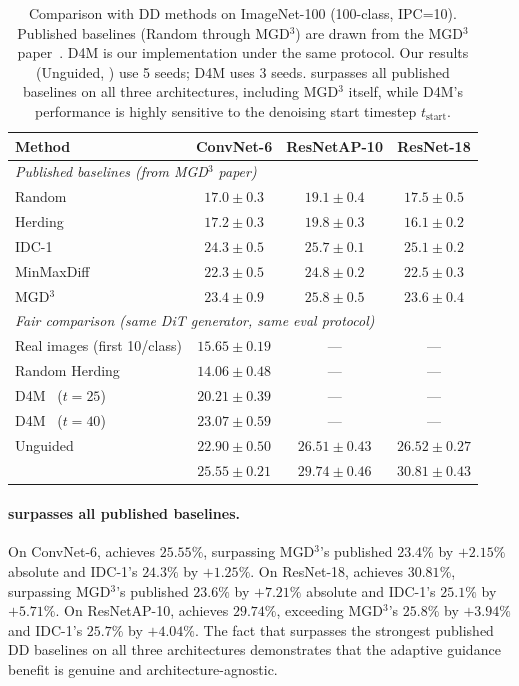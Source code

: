\begin{table}[t]
\centering
\caption{Comparison with DD methods on ImageNet-100 (100-class, IPC=10). Published baselines (Random through MGD$^3$) are drawn from the MGD$^3$ paper~\cite{chansantiago2025modeguided}. D4M is our implementation under the same protocol. Our results (Unguided, \cags{}) use 5 seeds; D4M uses 3 seeds. \cags{} surpasses all published baselines on all three architectures, including MGD$^3$ itself, while D4M's performance is highly sensitive to the denoising start timestep $t_{\text{start}}$.}
\label{tab:dd-baselines}
\begin{tabular}{lccc}
\toprule
\textbf{Method} & \textbf{ConvNet-6} & \textbf{ResNetAP-10} & \textbf{ResNet-18} \\
\midrule
\multicolumn{4}{l}{\emph{Published baselines (from MGD$^3$ paper)}} \\
Random & $17.0 \pm 0.3$ & $19.1 \pm 0.4$ & $17.5 \pm 0.5$ \\
Herding & $17.2 \pm 0.3$ & $19.8 \pm 0.3$ & $16.1 \pm 0.2$ \\
IDC-1~\cite{kim2022dataset} & $24.3 \pm 0.5$ & $25.7 \pm 0.1$ & $25.1 \pm 0.2$ \\
MinMaxDiff~\cite{fan2025generative} & $22.3 \pm 0.5$ & $24.8 \pm 0.2$ & $22.5 \pm 0.3$ \\
MGD$^3$~\cite{chansantiago2025modeguided} & $23.4 \pm 0.9$ & $25.8 \pm 0.5$ & $23.6 \pm 0.4$ \\
\midrule
\multicolumn{4}{l}{\emph{Fair comparison (same DiT generator, same eval protocol)}} \\
Real images (first 10/class) & $15.65 \pm 0.19$ & --- & --- \\
Random Herding & $14.06 \pm 0.48$ & --- & --- \\
D4M~\cite{su2024dataset} ($t{=}25$) & $20.21 \pm 0.39$ & --- & --- \\
D4M~\cite{su2024dataset} ($t{=}40$) & $23.07 \pm 0.59$ & --- & --- \\
Unguided & $22.90 \pm 0.50$ & $26.51 \pm 0.43$ & $26.52 \pm 0.27$ \\
\cags{} & $\mathbf{25.55 \pm 0.21}$ & $\mathbf{29.74 \pm 0.46}$ & $\mathbf{30.81 \pm 0.43}$ \\
\bottomrule
\end{tabular}
\end{table}

\paragraph{\cags{} surpasses all published baselines.}
On ConvNet-6, \cags{} achieves $25.55\%$, surpassing MGD$^3$'s published $23.4\%$ by $+2.15\%$ absolute and IDC-1's $24.3\%$ by $+1.25\%$. On ResNet-18, \cags{} achieves $30.81\%$, surpassing MGD$^3$'s published $23.6\%$ by $+7.21\%$ absolute and IDC-1's $25.1\%$ by $+5.71\%$. On ResNetAP-10, \cags{} achieves $29.74\%$, exceeding MGD$^3$'s $25.8\%$ by $+3.94\%$ and IDC-1's $25.7\%$ by $+4.04\%$. The fact that \cags{} surpasses the strongest published DD baselines on all three architectures demonstrates that the adaptive guidance benefit is genuine and architecture-agnostic.

